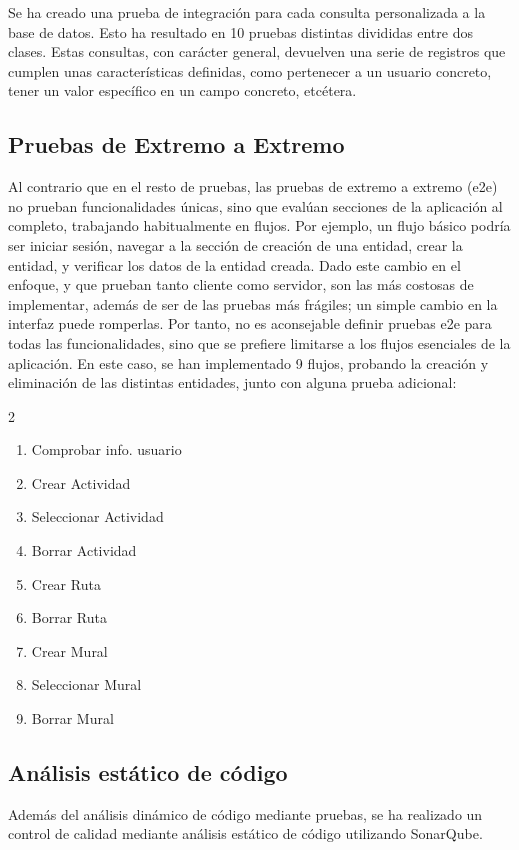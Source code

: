 Se ha creado una prueba de integración para cada consulta personalizada a la base de datos. Esto ha resultado en 10 pruebas distintas divididas entre dos clases. Estas consultas, con carácter general, devuelven una serie de registros que cumplen unas características definidas, como pertenecer a un usuario concreto, tener un valor específico en un campo concreto, etcétera.

\subsection{Pruebas de Extremo a Extremo}
Al contrario que en el resto de pruebas, las pruebas de extremo a extremo (e2e) no prueban funcionalidades únicas, sino que evalúan secciones de la aplicación al completo, trabajando habitualmente en flujos. Por ejemplo, un flujo básico podría ser iniciar sesión, navegar a la sección de creación de una entidad, crear la entidad, y verificar los datos de la entidad creada. Dado este cambio en el enfoque, y que prueban tanto cliente como servidor, son las más costosas de implementar, además de ser de las pruebas más frágiles; un simple cambio en la interfaz puede romperlas. Por tanto, no es aconsejable definir pruebas e2e para todas las funcionalidades, sino que se prefiere limitarse a los flujos esenciales de la aplicación. En este caso, se han implementado 9 flujos, probando la creación y eliminación de las distintas entidades, junto con alguna prueba adicional:
\begin{multicols}{2}
\begin{enumerate}
    \item Comprobar info. usuario 
    \item Crear Actividad
    \item Seleccionar Actividad
    \item Borrar Actividad
    \item Crear Ruta
    \item Borrar Ruta
    \item Crear Mural
    \item Seleccionar Mural
    \item Borrar Mural
\end{enumerate}
\end{multicols}

\subsection{Análisis estático de código}
Además del análisis dinámico de código mediante pruebas, se ha realizado un control de calidad mediante análisis estático de código utilizando SonarQube.

